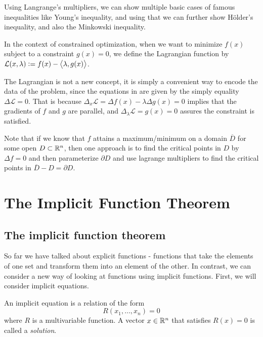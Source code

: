 \documentclass[11pt,a4paper]{article}
\begin{document}
\begin{remark}
  Using Langrange's multipliers,
  we can show multiple basic cases of famous inequalities like
  Young's inequality,
  and using that we can further show H\"older's inequality,
  and also the Minkowski inequality.
\end{remark}

\begin{definition}[Lagrangian]
  In the context of constrained optimization,
  when we want to minimize $f(x)$ subject to a constraint $g(x) = 0$,
  we define the Lagrangian function
  by $\mathcal L(x,\lambda) := f(x) - \left\langle \lambda, g(x) \right\rangle$.
\end{definition}

\begin{remark}
  The Lagrangian is not a new concept,
  it is simply a convenient way to encode the data of the problem,
  since the equations in 
  are given by the simply equality $\Delta \mathcal L = 0$.
  That is because $\Delta_x \mathcal L = \Delta f(x) - \lambda \Delta g(x) = 0$
  implies that the gradients of $f$ and $g$ are parallel,
  and $\Delta_{\lambda} \mathcal L = g(x) = 0$
  assures the constraint is satisfied.
\end{remark}

\begin{remark}
  Note that if we know that $f$ attains a maximum/minimum
  on a domain $\overline D$ for some open $D \subset \mathbb{R}^n$,
  then one approach is to find the critical points in $D$
  by $\Delta f = 0$ and then parameterize $\partial D$
  and use lagrange multipliers to find the critical points in
  $\overline D - D = \partial D$.
\end{remark}

\newpage

\section{The Implicit Function Theorem}
\subsection{The implicit function theorem}
So far we have talked about explicit functions - functions
that take the elements of one set and transform them into an element
of the other. In contrast, we can consider a new way of looking at
functions using implicit functions. First, we will consider 
implicit equations.
\begin{definition}
  An implicit equation is a relation of the form 
  \[
    R(x_1,\dots,x_n) = 0
  \]
  where $R$ is a multivariable function.
  A vector $x \in \mathbb{R}^n$ that satisfies $R(x) = 0$ is called a
  \textit{solution}.
\end{definition}
\end{document}
